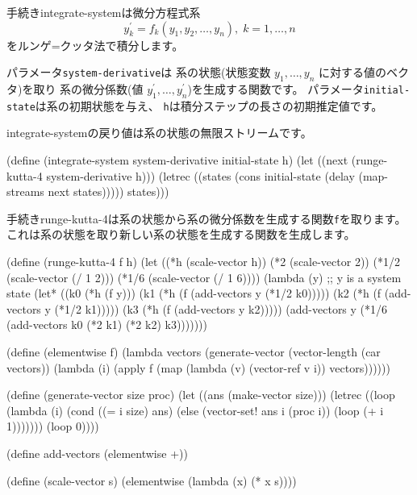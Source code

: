 

\nobreak
手続き{\cf integrate-system}は微分方程式系
$$y_k^\prime = f_k(y_1, y_2, \ldots, y_n), \; k = 1, \ldots, n$$
をルンゲ=クッタ法で積分します。

パラメータ{\tt system-derivative}は
系の状態(状態変数 $y_1, \ldots, y_n$ に対する値のベクタ)を取り
系の微分係数(値 $y_1^\prime, \ldots, y_n^\prime$)を生成する関数です。
パラメータ{\tt initial-state}は系の初期状態を与え、
{\tt h}は積分ステップの長さの初期推定値です。

{\cf integrate-system}の戻り値は系の状態の無限ストリームです。

\begin{schemenoindent}
(define (integrate-system system-derivative
                          initial-state
                          h)
  (let ((next (runge-kutta-4 system-derivative h)))
    (letrec ((states
              (cons initial-state
                    (delay (map-streams next
                                        states)))))
      states)))%
\end{schemenoindent}

手続き{\cf runge-kutta-4}は系の状態から系の微分係数を生成する関数{\tt f}を取ります。
これは系の状態を取り新しい系の状態を生成する関数を生成します。

\begin{schemenoindent}
(define (runge-kutta-4 f h)
  (let ((*h (scale-vector h))
        (*2 (scale-vector 2))
        (*1/2 (scale-vector (/ 1 2)))
        (*1/6 (scale-vector (/ 1 6))))
    (lambda (y)
      ;; y is a system state
      (let* ((k0 (*h (f y)))
             (k1 (*h (f (add-vectors y (*1/2 k0)))))
             (k2 (*h (f (add-vectors y (*1/2 k1)))))
             (k3 (*h (f (add-vectors y k2)))))
        (add-vectors y
          (*1/6 (add-vectors k0
                             (*2 k1)
                             (*2 k2)
                             k3)))))))

(define (elementwise f)
  (lambda vectors
    (generate-vector
     (vector-length (car vectors))
     (lambda (i)
       (apply f
              (map (lambda (v) (vector-ref  v i))
                   vectors))))))

(define (generate-vector size proc)
  (let ((ans (make-vector size)))
    (letrec ((loop
              (lambda (i)
                (cond ((= i size) ans)
                      (else
                       (vector-set! ans i (proc i))
                       (loop (+ i 1)))))))
      (loop 0))))

(define add-vectors (elementwise +))

(define (scale-vector s)
  (elementwise (lambda (x) (* x s))))%
\end{schemenoindent}

